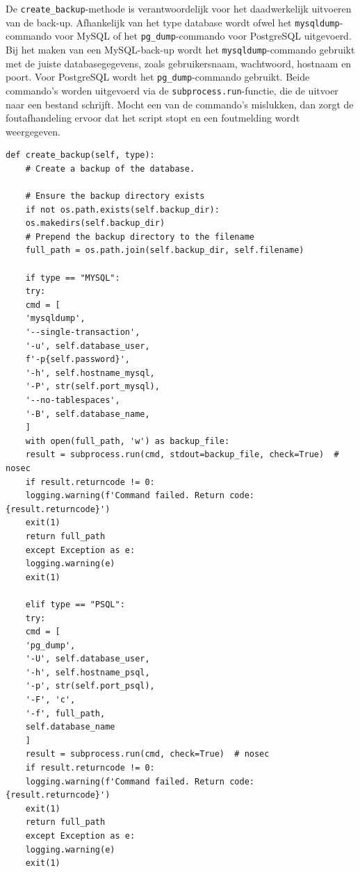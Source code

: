 De \texttt{create\_backup}-methode is verantwoordelijk voor het daadwerkelijk uitvoeren van de back-up. Afhankelijk van het type database wordt ofwel het \texttt{mysqldump}-commando voor MySQL of het \texttt{pg\_dump}-commando voor PostgreSQL uitgevoerd. Bij het maken van een MySQL-back-up wordt het \texttt{mysqldump}-commando gebruikt met de juiste databasegegevens, zoals gebruikersnaam, wachtwoord, hostnaam en poort. Voor PostgreSQL wordt het \texttt{pg\_dump}-commando gebruikt. Beide commando’s worden uitgevoerd via de \texttt{subprocess.run}-functie, die de uitvoer naar een bestand schrijft. Mocht een van de commando's mislukken, dan zorgt de foutafhandeling ervoor dat het script stopt en een foutmelding wordt weergegeven.
\begin{lstlisting}[language=script, caption={create\_backup-methode van het python-script.}]
    def create_backup(self, type):
    # Create a backup of the database.
    
    # Ensure the backup directory exists
    if not os.path.exists(self.backup_dir):
    os.makedirs(self.backup_dir)
    # Prepend the backup directory to the filename
    full_path = os.path.join(self.backup_dir, self.filename)
    
    if type == "MYSQL":
    try:
    cmd = [
    'mysqldump',
    '--single-transaction',
    '-u', self.database_user,
    f'-p{self.password}',
    '-h', self.hostname_mysql,
    '-P', str(self.port_mysql),
    '--no-tablespaces',
    '-B', self.database_name,
    ]
    with open(full_path, 'w') as backup_file:
    result = subprocess.run(cmd, stdout=backup_file, check=True)  # nosec
    if result.returncode != 0:
    logging.warning(f'Command failed. Return code: {result.returncode}')
    exit(1)
    return full_path
    except Exception as e:
    logging.warning(e)
    exit(1)

    elif type == "PSQL":
    try:
    cmd = [
    'pg_dump',
    '-U', self.database_user,
    '-h', self.hostname_psql,
    '-p', str(self.port_psql),
    '-F', 'c',
    '-f', full_path,
    self.database_name
    ]
    result = subprocess.run(cmd, check=True)  # nosec
    if result.returncode != 0:
    logging.warning(f'Command failed. Return code: {result.returncode}')
    exit(1)
    return full_path
    except Exception as e:
    logging.warning(e)
    exit(1)
\end{lstlisting}

